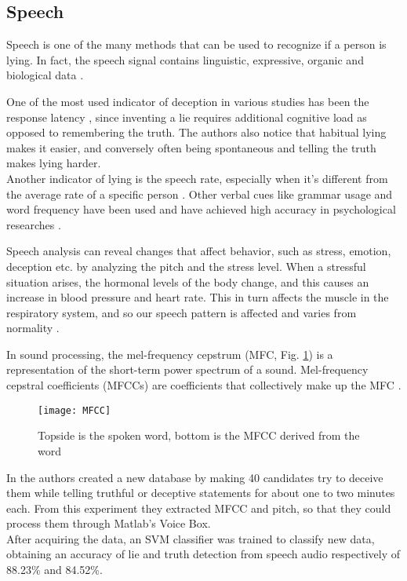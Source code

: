 \subsection{Speech}
Speech is one of the many methods that can be used to recognize if a person is lying. In fact, the speech signal contains linguistic, expressive, organic and biological data \cite{norena}.

One of the most used indicator of deception in various studies has been the response latency \cite{EaseLying}, since inventing a lie requires additional cognitive load as opposed to remembering the truth. The authors also notice that habitual lying makes it easier, and conversely often being spontaneous and telling the truth makes lying harder.\\
Another indicator of lying is the speech rate, especially when it's different from the average rate of a specific person \cite{TemporalCues}. Other verbal cues like grammar usage and word frequency have been used and have achieved high accuracy in psychological researches \cite{PorterTruthLying}.

Speech analysis can reveal changes that affect behavior, such as stress, emotion, deception etc. by analyzing the pitch and the stress level. When a stressful situation arises, the hormonal levels of the body change, and this causes an increase in blood pressure and heart rate. This in turn affects the muscle in the respiratory system, and so our speech pattern is affected and varies from normality \cite{norena}.

In sound processing, the mel-frequency cepstrum (MFC, Fig. \ref{fig:MFCC}) is a representation of the short-term power spectrum of a sound. Mel-frequency cepstral coefficients (MFCCs) are coefficients that collectively make up the MFC \cite{wiki:mfcc}.

\begin{figure}[H]
	\centering
	\texttt{[image: MFCC]}
	\caption{Topside is the spoken word, bottom is the MFCC derived from the word}
	\label{fig:MFCC}
\end{figure}

In \cite{relidss} the authors created a new database by making 40 candidates try to deceive them while telling truthful or deceptive statements for about one to two minutes each. From this experiment they extracted MFCC and pitch, so that they could process them through Matlab's Voice Box. \\
After acquiring the data, an SVM classifier was trained to classify new data, obtaining an accuracy of lie and truth detection from speech audio respectively of 88.23\% and 84.52\%.

